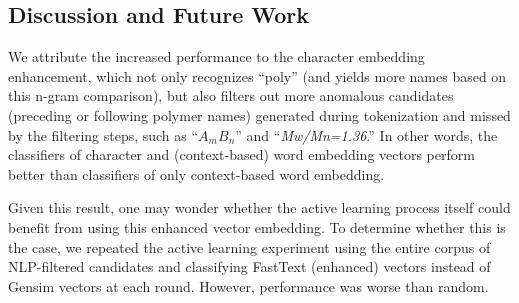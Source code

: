 \subsection{Discussion and Future Work}
\label{sec:discussion}
We attribute the increased performance to the character embedding enhancement, which not only recognizes ``poly'' (and yields more names based on this n-gram comparison), 
but also filters out more anomalous candidates (preceding or following polymer names) generated during tokenization and missed by the filtering steps, 
such as ``\textit{$A_mB_n$}'' and ``\textit{Mw/Mn=1.36}.'' 
In other words, the classifiers of character and (context-based) word embedding vectors perform better than classifiers of only context-based word embedding.

Given this result, one may wonder whether the active learning process itself could benefit from using this enhanced vector embedding. 
To determine whether this is the case,
we repeated the active learning experiment using the entire corpus of NLP-filtered candidates and classifying FastText (enhanced) vectors instead of Gensim vectors at each round. 
However, performance was worse than random.


